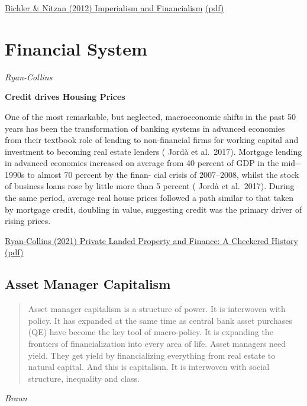 \documentclass[
]{book}
\begin{document}
\href{http://bnarchives.yorku.ca/329/}{Bichler \& Nitzan (2012) Imperialism and Financialism}
\href{pdf/Bichler_Nitzan_2012_Imperialism_and_Financialism.pdf}{(pdf)}

\hypertarget{financial-system}{%
\chapter{Financial System}\label{financial-system}}

\emph{Ryan-Collins}

\textbf{Credit drives Housing Prices}

One of the most remarkable, but
neglected, macroeconomic shifts in the past 50 years has been the
transformation of banking systems in advanced economies from their
textbook role of lending to non-­financial firms for working capital
and investment to becoming real estate lenders ( Jordà et al.~2017).
Mortgage lending in advanced economies increased on average from
40 percent of GDP in the mid-­1990s to almost 70 percent by the finan-
cial crisis of 2007--­2008, whilst the stock of business loans rose by
little more than 5 percent ( Jordà et al.~2017). During the same period,
average real house prices followed a path similar to that taken by
mortgage credit, doubling in value, suggesting credit was the primary
driver of rising prices.

\href{https://onlinelibrary.wi\%20ley.com/doi/10.1111/ajes.12387}{Ryan-Collins (2021) Private Landed Property and Finance: A Checkered History}
\href{pdf/Ryan-Collins_2021_Private_Landed_Property_and_Finance.pdf}{(pdf)}

\hypertarget{asset-manager-capitalism}{%
\section{Asset Manager Capitalism}\label{asset-manager-capitalism}}

\begin{quote}
Asset manager capitalism is a structure of power. It is interwoven with policy. It has expanded at the same time as central bank asset purchases (QE) have become the key tool of macro-policy. It is expanding the frontiers of financialization into every area of life. Asset managers need yield. They get yield by financializing everything from real estate to natural capital. And this is capitalism. It is interwoven with social structure, inequality and class.
\end{quote}

\emph{Braun}
\end{document}
